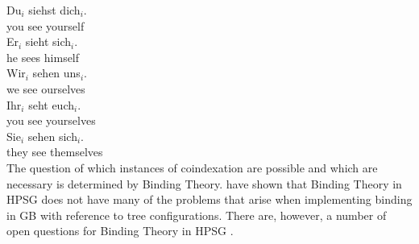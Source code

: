 \ex 
\gll Du$_i$ siehst dich$_i$.\\
     you see yourself\\
\ex 
\gll Er$_i$ sieht sich$_i$.\\
     he sees himself\\
\ex 
\gll Wir$_i$ sehen uns$_i$.\\
     we      see   ourselves\\
\ex 
\gll Ihr$_i$ seht euch$_i$.\\
     you see yourselves\\
\ex 
\gll Sie$_i$ sehen sich$_i$.\\
     they see themselves\\
\zl
The question of which instances of coindexation are possible and which are necessary is determined by Binding Theory.
\citet{PS92,ps2} have shown that Binding Theory in HPSG does not have many of the problems that arise when implementing binding in GB
with reference to tree configurations. There are, however, a number of open questions for Binding Theory in HPSG \citep[Section~20.4]{Mueller99a}.

